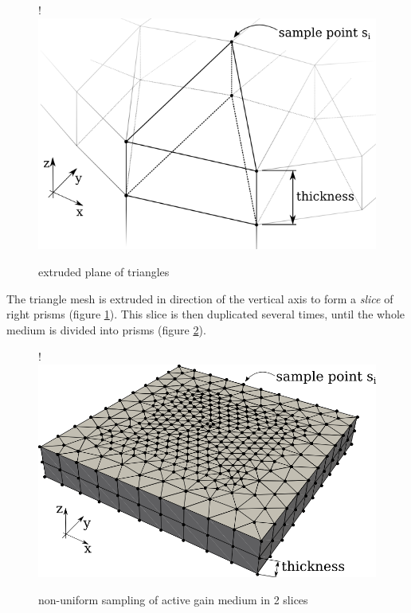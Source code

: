 \begin{figure}[H]
  \centerline{
     {!} {\includegraphics{graphics/delauny_3.png}}
  }
  \caption{extruded plane of triangles}
  \label{graphic:extruded_mesh}
\end{figure}

The triangle mesh is extruded in direction of the vertical axis to form a
\emph{slice} of right prisms (figure \ref{graphic:extruded_mesh}). This
slice is then duplicated several times, until the whole medium is divided into
prisms (figure \ref{graphic:samples_reduced}).

\begin{figure}[H]
  \centerline{
     {!} {\includegraphics{graphics/samples_reduced.png}}
  }
  \caption{non-uniform sampling of active gain medium in 2 slices}
  \label{graphic:samples_reduced}
\end{figure}




